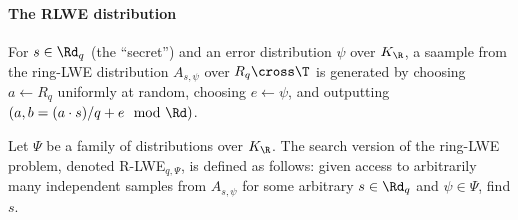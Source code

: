 \paragraph{The RLWE distribution}
\begin{definition}
	For $s \in \Rd_q$ (the ``secret'') and an error distribution $\psi$ over $K_{\R}$, a saample from the ring-LWE distribution $A_{s, \psi}$ over $R_q \cross \T$ is generated by choosing $a \leftarrow R_q$ uniformly at random, choosing $e \leftarrow \psi$, and outputting $(a, b = (a \cdot s)/q + e \mod \Rd)$.
\end{definition}
\begin{definition}
	Let $\Psi$ be a family of distributions over $K_{\R}$. The search version of the ring-LWE problem, denoted R-LWE$_{q, \Psi}$, is defined as follows: given access to arbitrarily many independent samples from $A_{s, \psi}$ for some arbitrary $s \in \Rd_q$ and $\psi \in \Psi$, find $s$.
\end{definition}
